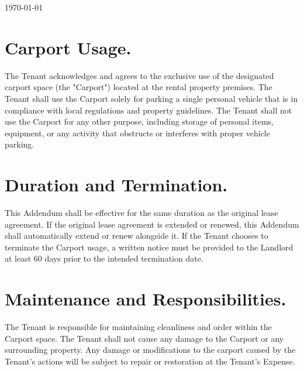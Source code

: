 \documentclass[9pt]{article}
\begin{document}

	\begin{center}
		\centering {}
	\end{center}
	\hfill \today

	\vspace{0.5cm}
	\tenantinfo{}{}

	\section{Carport Usage.}
	The Tenant acknowledges and agrees to the exclusive use of the designated carport space (the
	"Carport") located at the rental property premises. The Tenant shall use the Carport solely for parking
	a single personal vehicle that is in compliance with local regulations and property guidelines. The
	Tenant shall not use the Carport for any other purpose, including storage of personal items,
	equipment, or any activity that obstructs or interferes with proper vehicle parking.

	\section{Duration and Termination.}
	This Addendum shall be effective for the same duration as the original lease agreement. If the original
	lease agreement is extended or renewed, this Addendum shall automatically extend or renew
	alongside it. If the Tenant chooses to terminate the Carport usage, a written notice must be provided
	to the Landlord at least 60 days prior to the intended termination date.

	\section{Maintenance and Responsibilities.}
	The Tenant is responsible for maintaining cleanliness and order within the Carport space. The Tenant
	shall not cause any damage to the Carport or any surrounding property. Any damage or modifications to the carport caused by the Tenant's actions will be subject to repair or restoration at the Tenant's Expense.

	
\end{document}

